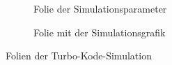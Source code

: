\begin{figure}[th]
\centering
	\begin{subfigure}{0.45\textwidth}
	\centering
	\caption{Folie der Simulationsparameter}
	\label{pic:TurboSimulationParameter}
	\end{subfigure}
	\qquad
	\begin{subfigure}{0.45\textwidth}
	\centering
	\caption{Folie mit der Simulationsgrafik}
	\label{pic:TurboSimulationPlot}
	\end{subfigure}
\caption{Folien der Turbo-Kode-Simulation}
\end{figure}

